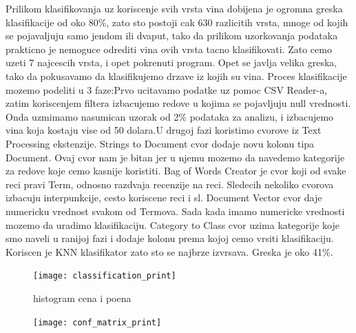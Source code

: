 \documentclass[11pt]{article} %
\begin{document}
Prilikom klasifikovanja uz koriscenje svih vrsta vina dobijena je ogromna greska klasifikacije od oko 80\%, zato sto postoji cak 630
razlicitih vrsta, mnoge od kojih se pojavaljuju samo jendom ili dvaput, tako da prilikom uzorkovanja podataka prakticno je nemoguce 
odrediti vina ovih vrsta tacno klasifikovati. Zato cemo uzeti 7 najcescih vrsta, i opet pokrenuti program.\newline
Opet se javlja velika greska, tako da pokusavamo da klasifikujemo drzave iz kojih su vina. \newline
Proces klasifikacije mozemo podeliti u 3 faze:\newline Prvo ucitavamo podatke uz pomoc CSV Reader-a, zatim koriscenjem filtera izbacujemo
redove u kojima se pojavljuju null vrednosti. Onda uzmimamo nasumican uzorak od 2\% podataka za analizu, i izbacujemo vina koja kostaju vise od 
50 dolara.\newline U drugoj fazi koristimo cvorove iz Text Processing ekstenzije. Strings to Document cvor dodaje novu kolonu tipa Document.
Ovaj cvor nam je bitan jer u njemu mozemo da navedemo kategorije za redove koje cemo kasnije koristiti. Bag of Words Creator je cvor koji 
od svake reci pravi Term, odnosno razdvaja recenzije na reci. Sledecih nekoliko cvorova izbacuju interpunkcije, cesto koriscene reci i sl. Document
Vector cvor daje numericku vrednost svakom od Termova.\newline
Sada kada imamo numericke vrednosti mozemo da uradimo klasifikaciju. Category to Class cvor uzima kategorije koje smo naveli u ranijoj fazi i dodaje 
kolonu prema kojoj cemo vrsiti klasifikaciju. Koriscen je KNN klasifikator zato sto se najbrze izvrsava. Greska je oko 41\%.
\begin{figure}[h!]
	\centering
		\texttt{[image: classification\_print]}
		\caption{histogram cena i poena}
	\end{figure}
\begin{figure}[h!]
	\centering
		\texttt{[image: conf\_matrix\_print]}
	\end{figure}
\newpage
\end{document}
